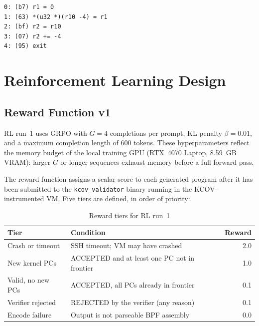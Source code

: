 \begin{lstlisting}[caption={Verifier-log assembly format --- five instructions}]
0: (b7) r1 = 0
1: (63) *(u32 *)(r10 -4) = r1
2: (bf) r2 = r10
3: (07) r2 += -4
4: (95) exit
\end{lstlisting}

\section{Reinforcement Learning Design}
\label{sec:rl-design}

\subsection{Reward Function v1}
\label{sec:reward-v1}

RL run~1 uses GRPO with $G = 4$ completions per prompt, KL penalty
$\beta = 0.01$, and a maximum completion length of 600 tokens.
These hyperparameters reflect the memory budget of the local training GPU
(RTX~4070 Laptop, 8.59~GB VRAM): larger $G$ or longer sequences exhaust memory
before a full forward pass.

The reward function assigns a scalar score to each generated program after it has
been submitted to the \texttt{kcov\_validator} binary running in the KCOV-instrumented
VM.
Five tiers are defined, in order of priority:

\begin{table}[h]
\centering
\caption{Reward tiers for RL run~1}
\label{tab:reward-v1}
\begin{tabular}{llr}
\toprule
Tier & Condition & Reward \\
\midrule
Crash or timeout   & SSH timeout; VM may have crashed                & 2.0 \\
New kernel PCs     & ACCEPTED and at least one PC not in frontier    & 1.0 \\
Valid, no new PCs  & ACCEPTED, all PCs already in frontier           & 0.1 \\
Verifier rejected  & REJECTED by the verifier (any reason)           & 0.1 \\
Encode failure     & Output is not parseable BPF assembly            & 0.0 \\
\bottomrule
\end{tabular}
\end{table}

